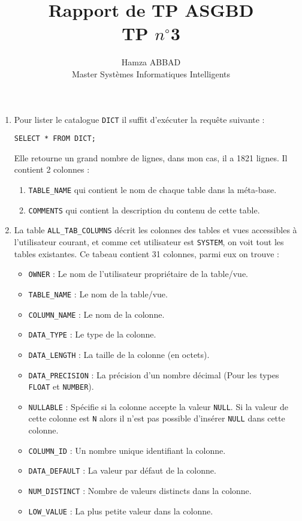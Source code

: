 \documentclass[12pt,a4paper]{article}
\author{Hamza ABBAD\\ Master Systèmes Informatiques Intelligents}
\title{\textbf{Rapport de TP ASGBD} \\ TP $n^{\circ}$3}
\begin{document}
\maketitle
\begin{enumerate}
	\item Pour lister le catalogue \texttt{DICT} il suffit d'exécuter la requête suivante :
	\begin{lstlisting}[style=OracleSQL]
		SELECT * FROM DICT;
	\end{lstlisting}
	Elle retourne un grand nombre de lignes, dans mon cas, il a 1821 lignes. Il contient 2 colonnes :
	\begin{enumerate}
		\item \texttt{TABLE\_NAME} qui contient le nom de chaque table dans la méta-base.
		\item \texttt{COMMENTS} qui contient la description du contenu de cette table.
	\end{enumerate}
	\item La table \texttt{ALL\_TAB\_COLUMNS} décrit les colonnes des tables et vues accessibles à l'utilisateur courant, et
	comme cet utilisateur est \texttt{SYSTEM}, on voit tout les tables existantes.
	Ce tabeau contient 31 colonnes, parmi eux on trouve :
	\begin{itemize}
		\item \texttt{OWNER} : Le nom de l'utilisateur propriétaire de la table/vue.
		\item \texttt{TABLE\_NAME} : Le nom de la table/vue.
		\item \texttt{COLUMN\_NAME} : Le nom de la colonne.
		\item \texttt{DATA\_TYPE} : Le type de la colonne.
		\item \texttt{DATA\_LENGTH} : La taille de la colonne (en octets).
		\item \texttt{DATA\_PRECISION} : La précision d'un nombre décimal (Pour les types \texttt{FLOAT} et \texttt{NUMBER}).
		\item \texttt{NULLABLE} : Spécifie si la colonne accepte la valeur \texttt{NULL}. Si la valeur de cette colonne est \texttt{N}
		alors il n'est pas possible d'insérer \texttt{NULL} dans cette colonne.
		\item \texttt{COLUMN\_ID} : Un nombre unique identifiant la colonne.
		\item \texttt{DATA\_DEFAULT} : La valeur par défaut de la colonne.
		\item \texttt{NUM\_DISTINCT} : Nombre de valeurs distincts dans la colonne.
		\item \texttt{LOW\_VALUE} : La plus petite valeur dans la colonne.

\end{itemize}
\end{enumerate}
\end{document}
